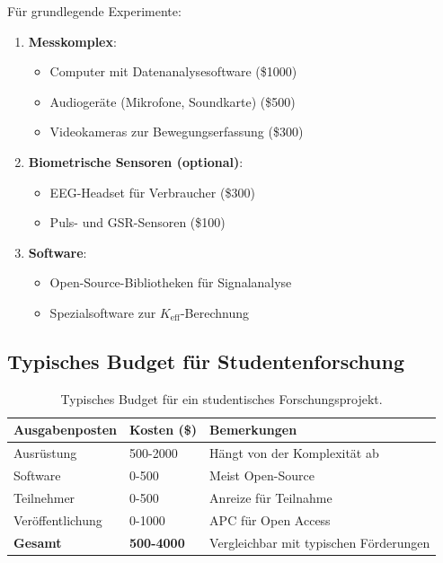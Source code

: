 \documentclass[12pt,a4paper]{article}
\begin{document}
	Für grundlegende Experimente:
	\begin{enumerate}
		\item \textbf{Messkomplex}:
		\begin{itemize}
			\item Computer mit Datenanalysesoftware (\$1000)
			\item Audiogeräte (Mikrofone, Soundkarte) (\$500)
			\item Videokameras zur Bewegungserfassung (\$300)
		\end{itemize}
		
		\item \textbf{Biometrische Sensoren (optional)}:
		\begin{itemize}
			\item EEG-Headset für Verbraucher (\$300)
			\item Puls- und GSR-Sensoren (\$100)
		\end{itemize}
		
		\item \textbf{Software}:
		\begin{itemize}
			\item Open-Source-Bibliotheken für Signalanalyse
			\item Spezialsoftware zur $K_{\mathrm{eff}}$-Berechnung
		\end{itemize}
	\end{enumerate}
	
	\subsection{Typisches Budget für Studentenforschung}
	
	\begin{table}[h]
		\centering
		\begin{tabular}{p{}p{}p{}}
			\toprule
			\textbf{Ausgabenposten} & \textbf{Kosten (\$)} & \textbf{Bemerkungen} \\
			\midrule
			Ausrüstung & 500-2000 & Hängt von der Komplexität ab \\
			Software & 0-500 & Meist Open-Source \\
			Teilnehmer & 0-500 & Anreize für Teilnahme \\
			Veröffentlichung & 0-1000 & APC für Open Access \\
			\midrule
			\textbf{Gesamt} & \textbf{500-4000} & Vergleichbar mit typischen Förderungen \\
			\bottomrule
		\end{tabular}
		\caption{Typisches Budget für ein studentisches Forschungsprojekt.}
		\label{tab:student-budget}
	\end{table}
	
\end{document}
